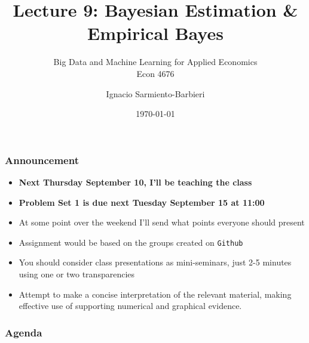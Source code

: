 \documentclass[
  shownotes,
  xcolor={svgnames},
  hyperref={colorlinks,citecolor=DarkBlue,linkcolor=DarkRed,urlcolor=DarkBlue}
  ]{beamer}
\begin{document}
\title[Lecture 9]{Lecture 9: Bayesian Estimation \& Empirical Bayes}
\subtitle{Big Data and Machine Learning for Applied Economics \\ Econ 4676}
\date{\today}

\author[Sarmiento-Barbieri]{Ignacio Sarmiento-Barbieri}


\begin{frame}[noframenumbering]
\maketitle
\end{frame}



\begin{frame}
\frametitle{Announcement }


\begin{itemize} 
    \item {\bf Next Thursday September 10, I'll be teaching the class} 
    \bigskip
    \item {\bf Problem Set 1 is due next Tuesday September 15 at 11:00} 
    \bigskip
    \item At some point over the weekend I'll send what points everyone should present
    \bigskip
    \item Assignment would be based on the groups created on \texttt{Github}
    \bigskip
    \item  You should consider class presentations as mini-seminars, just 2-5 minutes using one or two transparencies
    \bigskip
    \item  Attempt to make a concise interpretation of the relevant material, making effective use of supporting numerical and graphical evidence.    
\end{itemize}
\end{frame}


\begin{frame}
\frametitle{Agenda}

\tableofcontents


\end{frame}

\end{document}
